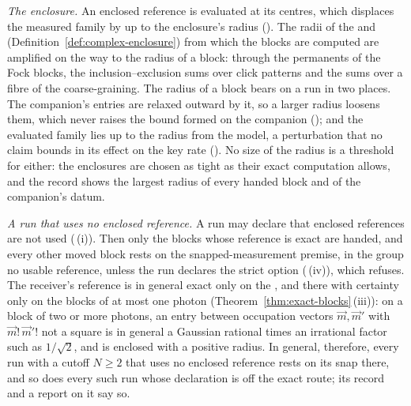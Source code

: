 \begin{remark}
\emph{The enclosure.} An enclosed reference is evaluated at its centres,
which displaces the measured family by up to the enclosure's radius
(). The radii of the
 and
(Definition~\ref{def:complex-enclosure}) from which the blocks are computed
are amplified on the way to the radius of a block: through the permanents of
the Fock blocks, the inclusion--exclusion sums over click patterns and the
sums over a fibre of the coarse-graining. The radius of a block bears on a
run in two places. The companion's entries are relaxed outward by it, so a
larger radius loosens them, which never raises the bound formed on the
companion (); and the evaluated family
lies up to the radius from the model, a perturbation that no claim bounds
in its effect on the key rate ().
No size of the radius is a threshold for either: the enclosures are chosen
as tight as their exact computation allows, and the record shows the
largest radius of every handed block and of the companion's datum.

\emph{A run that uses no enclosed reference.} A run may declare that enclosed
references are not used (\,(i)). Then
only the blocks whose reference is exact are handed, and every other moved
block rests on the snapped-measurement premise, in the group no usable
reference, unless the run declares the strict option
(\,(iv)), which refuses. The receiver's
reference is in general exact only on the , and there with
certainty only on the blocks of at most one photon
(Theorem~\ref{thm:exact-blocks}\,(iii)): on a block of two or more photons,
an entry between occupation vectors $\vec m,\vec m'$ with
$\vec m!\,\vec m'!$ not a square is in general a Gaussian rational times an
irrational factor such as $1/\sqrt2$, and is enclosed with a positive radius.
In general, therefore, every run with a cutoff $N\ge2$ that uses no enclosed
reference rests on its snap there, and so does every such run whose
declaration is off the exact route; its record and a report on it say so.


\end{remark}
